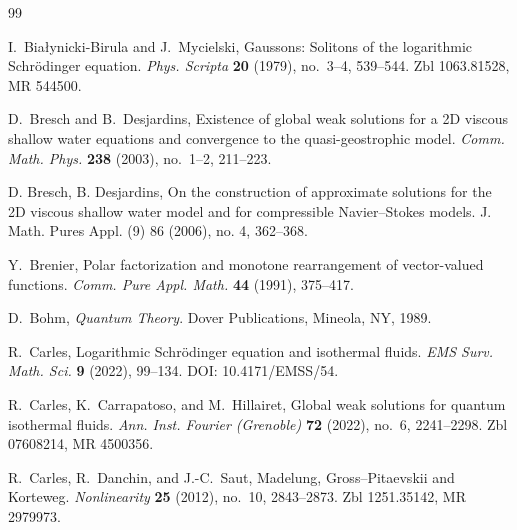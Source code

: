 \documentclass[11pt]{article}
\begin{document}
\begin{thebibliography}{99}



I.~Bia{\l}ynicki-Birula and J.~Mycielski,
\newblock Gaussons: Solitons of the logarithmic Schr\"odinger equation.
\newblock \emph{Phys. Scripta} \textbf{20} (1979), no.~3--4, 539--544.
\newblock Zbl 1063.81528, MR 544500.

D.~Bresch and B.~Desjardins,
\newblock Existence of global weak solutions for a 2D viscous shallow water equations and convergence to the quasi-geostrophic model.
\newblock \emph{Comm. Math. Phys.} \textbf{238} (2003), no.~1--2, 211--223.


D. Bresch, B. Desjardins,
On the construction of approximate solutions for the 2D viscous shallow water model and for compressible Navier--Stokes models.
J. Math. Pures Appl. (9) 86 (2006), no. 4, 362--368.


Y.~Brenier,
\newblock Polar factorization and monotone rearrangement of vector-valued functions.
\newblock \emph{Comm. Pure Appl. Math.} \textbf{44} (1991), 375--417.



D.~Bohm,
\newblock \emph{Quantum Theory}.
\newblock Dover Publications, Mineola, NY, 1989.

R.~Carles,
\newblock Logarithmic Schr\"odinger equation and isothermal fluids.
\newblock \emph{EMS Surv. Math. Sci.} \textbf{9} (2022), 99--134.
\newblock DOI: 10.4171/EMSS/54.


R.~Carles, K.~Carrapatoso, and M.~Hillairet,
\newblock Global weak solutions for quantum isothermal fluids.
\newblock \emph{Ann. Inst. Fourier (Grenoble)} \textbf{72} (2022), no.~6, 2241--2298.
\newblock Zbl 07608214, MR 4500356.

R.~Carles, R.~Danchin, and J.-C.~Saut,
\newblock Madelung, Gross--Pitaevskii and Korteweg.
\newblock \emph{Nonlinearity} \textbf{25} (2012), no.~10, 2843--2873.
\newblock Zbl 1251.35142, MR 2979973.


\end{thebibliography}
\end{document}
